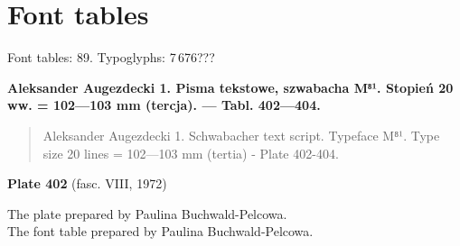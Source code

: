 \documentclass[12pt]{article}
\newcommand{\pismoPL}[1]{{\relsize{2}\Junicode\textbf{#1}}}
\newcommand{\pismoEN}[1]{{\relsize{1}\Junicode\begin{quote}#1\end{quote}}}
\newcommand{\plate}[3]{\textbf{Plate #1} (fasc. #2, #3)}
\begin{document}
\newpage
\section{\Huge Font tables}
\label{sec:font-tables}

Font tables: 89. Typoglyphs: 7\,676???
\newpage





\pismoPL{Aleksander Augezdecki 1. Pisma tekstowe, szwabacha M⁸¹. Stopień 20 ww. = 102—103 mm (tercja). — Tabl. 402—404.}


\pismoEN{Aleksander Augezdecki 1. Schwabacher text script. Typeface M⁸¹. Type size 20 lines = 102—103 mm (tertia) - Plate 402-404.}

  
    \medskip

    
\plate{402}{VIII}{1972}
    
The plate    prepared by Paulina Buchwald-Pelcowa.\\
The font table    prepared by Paulina Buchwald-Pelcowa.\\

    \medskip
    
\end{document}
